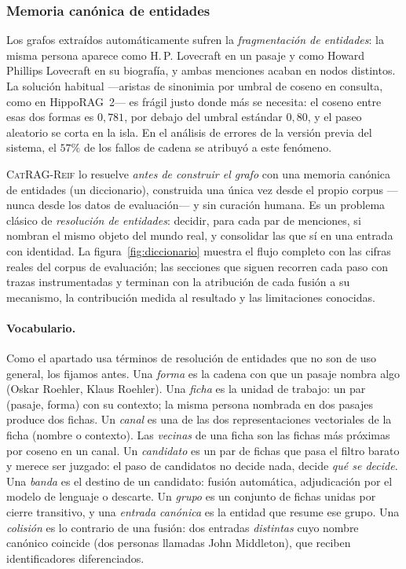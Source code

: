 \documentclass[11pt,a4paper]{article}
\newcommand{\sys}{\textsc{CatRAG-Reif}}          %
\newcommand{\hippo}{HippoRAG~2}
\begin{document}
\subsubsection{Memoria canónica de entidades}
\label{sec:diccionario}

Los grafos extraídos automáticamente sufren la \emph{fragmentación de
entidades}: la misma persona aparece como \guillemotleft{}H.\,P. Lovecraft\guillemotright{} en un pasaje y
como \guillemotleft{}Howard Phillips Lovecraft\guillemotright{} en su biografía, y ambas menciones acaban
en nodos distintos. La solución habitual ---aristas de sinonimia por umbral de
coseno en consulta, como en \hippo{}--- es frágil justo donde más se
necesita: el coseno entre esas dos formas es $0{,}781$, por debajo del
umbral estándar $0{,}80$, y el paseo aleatorio se corta en la
\guillemotleft{}isla\guillemotright{}. En el análisis de errores de la versión previa del sistema, el
$57\%$ de los fallos de cadena se atribuyó a este fenómeno.

\sys{} lo resuelve \emph{antes de construir el grafo} con una memoria
canónica de entidades (un diccionario), construida una única vez desde el
propio corpus ---nunca desde los datos de evaluación--- y sin curación
humana. Es un problema clásico de \emph{resolución de entidades}: decidir,
para cada par de menciones, si nombran el mismo objeto del mundo real, y
consolidar las que sí en una entrada con identidad. La
figura~\ref{fig:diccionario} muestra el flujo completo con las cifras reales
del corpus de evaluación; las secciones que siguen recorren cada paso con
trazas instrumentadas y terminan con la atribución de cada fusión a su
mecanismo, la contribución medida al resultado y las limitaciones
conocidas.

\paragraph{Vocabulario.}
Como el apartado usa términos de resolución de entidades que no son de uso
general, los fijamos antes. Una \emph{forma} es la cadena con que un pasaje
nombra algo (\guillemotleft{}Oskar Roehler\guillemotright{}, \guillemotleft{}Klaus Roehler\guillemotright{}). Una \emph{ficha} es la
unidad de trabajo: un par (pasaje, forma) con su contexto; la misma persona
nombrada en dos pasajes produce dos fichas. Un \emph{canal} es una de las dos
representaciones vectoriales de la ficha (nombre o contexto). Las
\emph{vecinas} de una ficha son las fichas más próximas por coseno en un
canal. Un \emph{candidato} es un par de fichas que pasa el filtro barato y
merece ser juzgado: el paso de candidatos no decide nada, decide \emph{qué
se decide}. Una \emph{banda} es el destino de un candidato: fusión
automática, adjudicación por el modelo de lenguaje o descarte. Un
\emph{grupo} es un conjunto de fichas unidas por cierre transitivo, y una
\emph{entrada canónica} es la entidad que resume ese grupo. Una
\emph{colisión} es lo contrario de una fusión: dos entradas \emph{distintas}
cuyo nombre canónico coincide (dos personas llamadas John Middleton), que
reciben identificadores diferenciados.
\end{document}
